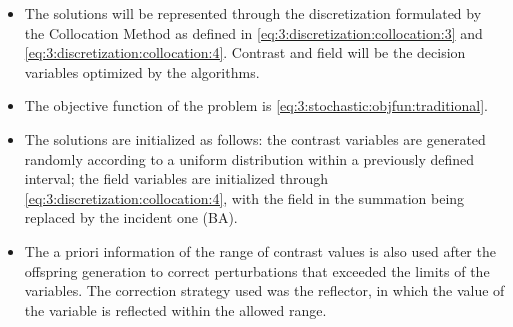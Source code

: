\begin{itemize}
\begin{itemize}
					\item The solutions will be represented through the discretization formulated by the Collocation Method as defined in \eqref{eq:3:discretization:collocation:3} and \eqref{eq:3:discretization:collocation:4}. Contrast and field will be the decision variables optimized by the algorithms.
					\item The objective function of the problem is \eqref{eq:3:stochastic:objfun:traditional}.
					\item The solutions are initialized as follows: the contrast variables are generated randomly according to a uniform distribution within a previously defined interval; the field variables are initialized through \eqref{eq:3:discretization:collocation:4}, with the field in the summation being replaced by the incident one (BA).
					\item The a priori information of the range of contrast values is also used after the offspring generation to correct perturbations that exceeded the limits of the variables. The correction strategy used was the reflector, in which the value of the variable is reflected within the allowed range.

\end{itemize}
\end{itemize}
